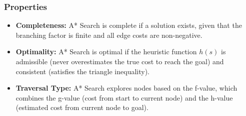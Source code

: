 \subsubsection*{Properties}
\begin{itemize}
    \item \textbf{Completeness:} A* Search is complete if a solution exists, given that the branching factor is finite and all edge costs are non-negative.
    \item \textbf{Optimality:} A* Search is optimal if the heuristic function \( h(s) \) is admissible (never overestimates the true cost to reach the goal) and consistent (satisfies the triangle inequality).
    \item \textbf{Traversal Type:} A* Search explores nodes based on the f-value, which combines the g-value (cost from start to current node) and the h-value (estimated cost from current node to goal).
\end{itemize}